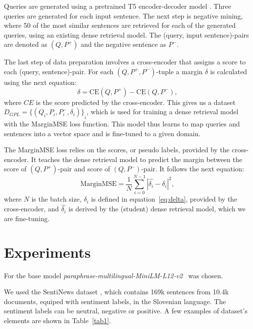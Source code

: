 \documentclass[fleqn,moreauthors,10pt]{ds_report}
\begin{document}
Queries are generated using a pretrained T5 encoder-decoder model \cite{T5}. Three queries are generated for each input sentence. The next step is negative mining, where 50 of the most similar sentences are retrieved for each of the generated queries, using an existing dense retrieval model. The (query, input sentence)-pairs are denoted as $(Q, P^{+})$ and the negative sentence as $P^{-}$.

The last step of data preparation involves a cross-encoder that assigns a score to each (query, sentence)-pair. For each $(Q, P^{+}, P^{-})$-tuple a margin $\delta$ is calculated using the next equation:
\begin{equation}
	\delta = \text{CE}(Q, P^{+}) - \text{CE}(Q, P^{-})\text{,}
\label{eq:delta}
\end{equation}
where $CE$ is the score predicted by the cross-encoder. This gives us a dataset $D_{GPL} = {\{ ( Q_i, P_i, P_i^{-}, \delta_i ) \}}_i$, which is used for training a dense retrieval model with the MarginMSE loss function. This model thus learns to map queries and sentences into a vector space and is fine-tuned to a given domain.

The MarginMSE loss \cite{marginMSE} relies on the scores, or pseudo labels, provided by the cross-encoder. It teaches the dense retrieval model to predict the margin between the score of $(Q, P^{+})$-pair and score of $(Q, P^{-})$-pair. It follows the next equation:
\begin{equation}
	\text{MarginMSE} = \frac{1}{N} \sum_{i=0}^{N-1} |\hat{\delta_i} - \delta_i|^{2} \text{,}
\label{eq:margin}
\end{equation}
where $N$ is the batch size, $\delta_i$ is defined in equation~\ref{eq:delta}, provided by the cross-encoder, and $\hat{\delta_i}$ is derived by the (student) dense retrieval model, which we are fine-tuning.





\section*{Experiments}
For the base model {\it paraphrase-multilingual-MiniLM-L12-v2}~\cite{reimers-2019-sentence-bert} was chosen.

We used the SentiNews dataset \cite{sentiNews}, which contains 169k sentences from 10.4k documents, equiped with sentiment labels, in the Slovenian language. The sentiment labels can be neutral, negative or positive. A few examples of dataset's elements are shown in Table~\ref{tab1}.
\end{document}
